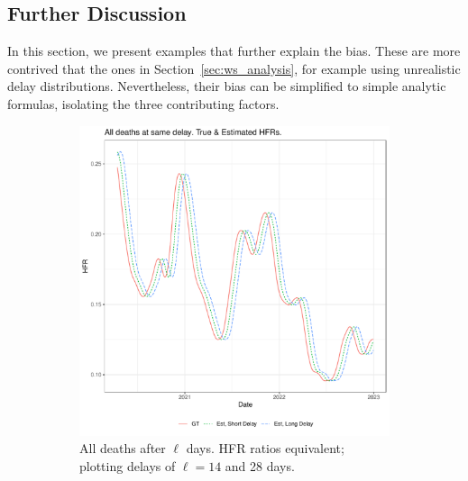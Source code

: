 \documentclass{article}
\begin{document}
\subsection{Further Discussion}\label{apx:analysis}
In this section, we present examples that further explain the bias. These are more contrived that the ones in Section~\ref{sec:ws_analysis}, for example using unrealistic delay distributions. Nevertheless, their bias can be simplified to simple analytic formulas, isolating the three contributing factors.

\begin{figure}
     \centering
     \begin{subfigure}[b]{0.45\linewidth}
         \centering
         \includegraphics[width=\linewidth]{Figs/Simulated/sim_onehot.pdf}
         \caption{All deaths after $\ell$ days. HFR ratios equivalent; plotting delays of $\ell=14$ and 28 days.}
         \label{fig:onehot}
     \end{subfigure}
     \hfill
     \begin{subfigure}[b]{0.45\linewidth}
         \centering

\end{subfigure}
\end{figure}
\end{document}
